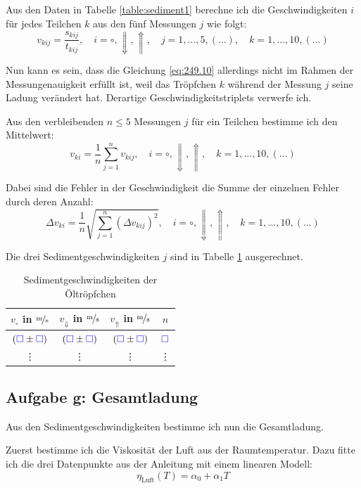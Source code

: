 \documentclass[11pt, ngerman]{article}
\newcommand{\emesswert}{\left(\messwert \pm \messwert \right)}
\newcommand{\messwert}{\textcolor{blue}{\square}}
\begin{document}
Aus den Daten in Tabelle \ref{table:sediment1} berechne ich die
Geschwindigkeiten $i$ für jedes Teilchen $k$ aus den fünf Messungen $j$ wie
folgt:
\[
	v_{kij} = \frac{s_{kij}}{t_{kij}}
	, \quad
	i = \circ, \Downarrow, \Uparrow
	, \quad
	j = 1, ..., 5, (...)
	, \quad
	k = 1, ..., 10, (...)
\]

Nun kann es sein, dass die Gleichung \eqref{eq:249.10} allerdings nicht im
Rahmen der Messungenauigkeit erfüllt ist, weil das Tröpfchen $k$ während der
Messung $j$ seine Ladung verändert hat. Derartige Geschwindigkeitstriplets
verwerfe ich.

Aus den verbleibenden $n \leq 5$ Messungen $j$ für ein Teilchen bestimme ich
den Mittelwert:
\[
	v_{ki} = \frac 1n \sum_{j=1}^n v_{kij}
	, \quad
	i = \circ, \Downarrow, \Uparrow
	, \quad
	k = 1, ..., 10, (...)
\]

Dabei sind die Fehler in der Geschwindigkeit die Summe der einzelnen Fehler durch deren Anzahl:
\[
	\Delta v_{ki} = \frac 1n \sqrt{ \sum_{j=1}^n (\Delta v_{kij})^2 }
	, \quad
	i = \circ, \Downarrow, \Uparrow
	, \quad
	k = 1, ..., 10, (...)
\]

Die drei Sedimentgeschwindigkeiten $j$ sind in Tabelle \ref{table:sediment2}
ausgerechnet.

\begin{table}[h!]
	\centering

	\begin{tabular}{cccc}
		$v_\circ$ in $\unitfrac ms$ & $v_\Downarrow$ in $\unitfrac ms$ & $v_\Uparrow$ in $\unitfrac ms$ & $n$ \\
		\hline
		$\emesswert$ & $\emesswert$ & $\emesswert$ & $\messwert$ \\
					\vdots & \vdots & \vdots & \vdots
	\end{tabular}

	\caption{Sedimentgeschwindigkeiten der Öltröpfchen}
	\label{table:sediment2}
\end{table}

\subsection{Aufgabe g: Gesamtladung}

Aus den Sedimentgeschwindigkeiten bestimme ich nun die Gesamtladung.

Zuerst bestimme ich die Viskosität der Luft aus der Raumtemperatur. Dazu fitte
ich die drei Datenpunkte aus der Anleitung mit einem linearen Modell:
\[ \eta_\text{Luft}(T) = \alpha_0 + \alpha_1 T \]
\end{document}
